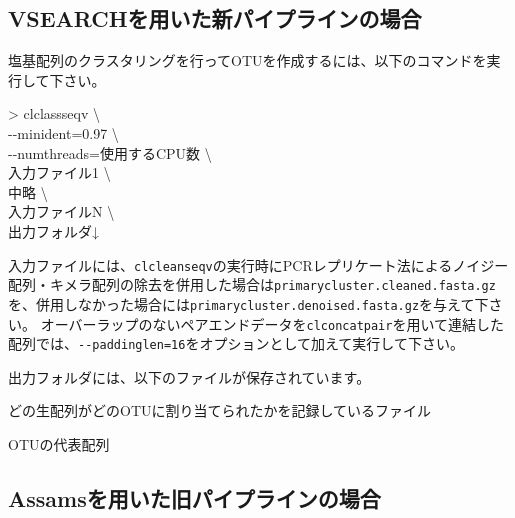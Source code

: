 \documentclass[titlepage,10pt,a4paper]{jsbook}
\newenvironment{cmd}{\begin{oframed}\raggedright\ttfamily\footnotesize\setlength{\baselineskip}{1.4em}}{\end{oframed}\vspace{-1em}}
\begin{document}
\subsection{VSEARCHを用いた新パイプラインの場合}

塩基配列のクラスタリングを行ってOTUを作成するには、以下のコマンドを実行して下さい。
\begin{cmd}
{\textgreater} clclassseqv {\textbackslash}\\
{-}{-}minident=0.97 {\textbackslash}\\
{-}{-}numthreads=使用するCPU数 {\textbackslash}\\
入力ファイル1 {\textbackslash}\\
中略 {\textbackslash}\\
入力ファイルN {\textbackslash}\\
出力フォルダ↓
\end{cmd}
入力ファイルには、\texttt{clcleanseqv}の実行時にPCRレプリケート法によるノイジー配列・キメラ配列の除去を併用した場合は\texttt{primarycluster.cleaned.fasta.gz}を、併用しなかった場合には\texttt{primarycluster.denoised.fasta.gz}を与えて下さい。
オーバーラップのないペアエンドデータを\texttt{clconcatpair}を用いて連結した配列では、\texttt{{-}{-}paddinglen=16}をオプションとして加えて実行して下さい。

出力フォルダには、以下のファイルが保存されています。
\begin{description}\small\setlength{\baselineskip}{1.1em}
\item[clustered.otu.gz] どの生配列がどのOTUに割り当てられたかを記録しているファイル
\item[clustered.fasta.gz] OTUの代表配列
\end{description}

\subsection{Assamsを用いた旧パイプラインの場合}
\end{document}
